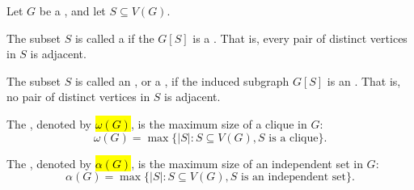 \begin{definition} \label{definition:clique_independent_set_of_a_graph}
Let $G$ be a , and let $S \subseteq V(G)$.

The subset $S$ is called a  if the  $G[S]$ is a . That is, every pair of distinct vertices in $S$ is adjacent.

The subset $S$ is called an , or a , if the induced subgraph $G[S]$ is an . That is, no pair of distinct vertices in $S$ is adjacent.

The , denoted by \hl{$\omega(G)$}, is the maximum size of a clique in $G$:
$$\omega(G) = \max\{|S| : S \subseteq V(G), S \text{ is a clique}\}.$$

The , denoted by \hl{$\alpha(G)$}, is the maximum size of an independent set in $G$:
$$\alpha(G) = \max\{|S| : S \subseteq V(G), S \text{ is an independent set}\}.$$
\end{definition}
